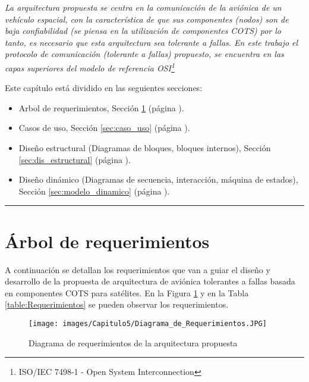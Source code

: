 \vspace{1cm}
\itshape
La arquitectura propuesta se centra en la comunicación de la aviónica de un
vehículo espacial, con la característica de que sus componentes (nodos) son
de baja confiabilidad (se piensa en la utilización de componentes COTS)
por lo tanto, es necesario que esta arquitectura sea tolerante a fallas. En este
trabajo el protocolo de comunicación (tolerante a fallas) propuesto,
se encuentra en las capas superiores del modelo de referencia OSI\footnote{ISO/IEC 7498-1 - Open System Interconnection}

Este capítulo está dividido en las seguientes secciones:

\begin{itemize}
\item Arbol de requerimientos, Sección \ref{sec:arbol_req} (página \pageref{sec:arbol_req}).
\item Casos de uso, Sección \ref{sec:caso_uso} (página \pageref{sec:caso_uso}).
\item Diseño estructural (Diagramas de bloques, bloques internos), Sección \ref{sec:dis_estructural}
(página \pageref{sec:dis_estructural}).
\item Diseño dinámico (Diagramas de secuencia, interacción, máquina de estados), Sección
\ref{sec:modelo_dinamico} (página \pageref{sec:modelo_dinamico}).
  
\end{itemize}
\upshape

\noindent\rule{\textwidth}{2pt}

\vspace{1cm}

\section{Árbol de requerimientos}\label{sec:arbol_req}
A continuación se detallan los requerimientos que van a guiar el diseño y
desarrollo de la propuesta de arquitectura de aviónica tolerantes a fallas
basada en componentes \ac{COTS} para satélites. En la Figura
\ref{fig:DiagramaRequerimientos} y en la Tabla \ref{table:Requerimientos} se pueden
observar los requerimientos. 

\begin{figure}[h!]
 \centering
 \texttt{[image: images/Capitulo5/Diagrama\_de\_Requerimientos.JPG]}
  \caption{Diagrama de requerimientos de la arquitectura propuesta}
\label{fig:DiagramaRequerimientos}
\end{figure} 

